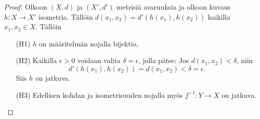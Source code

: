 \documentclass[12pt,a4paper,leqno]{report}
\theoremstyle{plain}
\theoremstyle{definition}
\theoremstyle{remark}
\begin{document}
\begin{proof}
Olkoon $(X,d)$ ja $(X',d')$ metrisiä avaruuksia ja olkoon kuvaus $h\colon X\rightarrow X'$ isometria. Tällöin $d(x_1,x_2)=d'(h(x_1),h(x_2))$ kaikilla $x_1,x_2 \in X$. Tällöin
\begin{itemize}
\item[(H1)] $h$ on määritelmän nojalla bijektio,
\item[(H2)] Kaikilla $\epsilon>0$ voidaan valita $\delta=\epsilon$, jolla pätee: Jos $d(x_1,x_2)<\delta$, niin 
$$d'(h(x_1),h(x_2))=d(x_1,x_2)<\delta=\epsilon.$$
Siis $h$ on jatkuva.
\item[(H3)] Edellisen kohdan ja isometrisuuden nojalla myös $f^{-1} \colon Y\rightarrow X$ on jatkuva. 
\end{itemize}
\end{proof}
\end{document}
